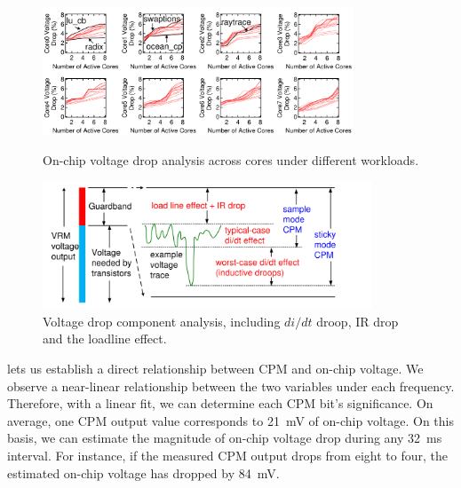 \begin{figure}[t]
  \centering
  \hspace{-0.5cm}
  \begin{minipage}{0.5\linewidth}
    \centering
    \includegraphics[trim=0 0 0 0,clip,height=1.5in]{graphs/voltage/cpm_scale_variation.pdf}
    \captionsetup{width=0.95\textwidth}
    \vspace{-0.2cm}
    \caption{On-chip voltage drop analysis across cores under different workloads.}
  \label{fig:cpm-variation} 
  \end{minipage}
\hspace{0cm}
  \begin{minipage}{0.47\linewidth}
    \centering
    \includegraphics[trim=0 0 0 0,clip,height=1.5in]{graphs/voltage/noise_components.pdf}
    \captionsetup{width=0.95\textwidth}
    \vspace{-0.3cm}
    \caption{Voltage drop component analysis, including $di/dt$ droop, IR drop and the loadline effect.}
    \label{fig:vnoise-component} 
  \end{minipage}
\end{figure}

 lets us establish a direct relationship between CPM and on-chip voltage. We observe a near-linear relationship between the two variables under each frequency. Therefore, with a linear fit, we can determine each CPM bit's significance. On average, one CPM output value corresponds to 21~mV of on-chip voltage. On this basis, we can estimate the magnitude of on-chip voltage drop during any 32~ms interval. For instance, if the measured CPM output drops from eight to four, the estimated on-chip voltage has dropped by 84~mV. 

